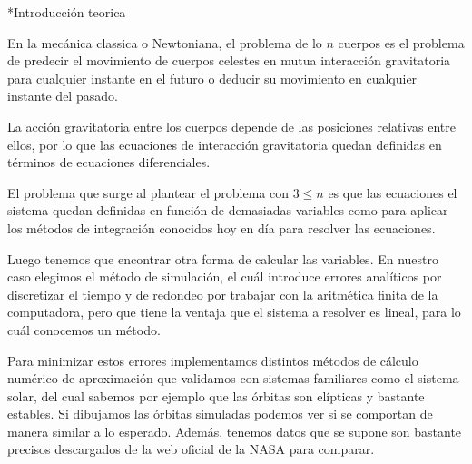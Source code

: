 \documentclass[12pt,titlepage]{article}
\newenvironment{usection}[1]{\newpage\begin{section}*{#1}	\addcontentsline{toc}{section}{#1}}{\end{section}}
\begin{document}


\palabraClave{}

\begin{titlepage}
\maketitle
\end{titlepage}
\tableofcontents
\newpage

	\begin{usection}{Introducción teorica}

		En la mecánica classica o Newtoniana, el problema de lo $n$
		cuerpos es el problema de predecir el movimiento de cuerpos
		celestes en mutua interacción gravitatoria para cualquier
		instante en el futuro o deducir su movimiento en cualquier
		instante del pasado.

		La acción gravitatoria entre los cuerpos depende de las
		posiciones relativas entre ellos, por lo que las ecuaciones de
		interacción gravitatoria quedan definidas en términos de
		ecuaciones diferenciales.

		El problema que surge al plantear el problema con $3 \leq n$ es
		que las ecuaciones el sistema quedan definidas en función de
		demasiadas variables como para aplicar los métodos de integración
		conocidos hoy en día para resolver las ecuaciones.

		Luego tenemos que encontrar otra forma de calcular las
		variables. En nuestro caso elegimos el método de simulación,
		el cuál introduce errores analíticos por discretizar el tiempo y
		de redondeo por trabajar con la aritmética finita de la
		computadora, pero que tiene la ventaja que el sistema a resolver
		es lineal, para lo cuál conocemos un método.

		Para minimizar estos errores implementamos distintos métodos de
		cálculo numérico de aproximación que validamos con sistemas
		familiares como el sistema solar, del cual sabemos por ejemplo
		que las órbitas son elípticas y bastante estables. Si dibujamos
		las órbitas simuladas podemos ver si se comportan de manera
		similar a lo esperado. Además, tenemos datos que se supone son
		bastante precisos descargados de la web oficial de la NASA para
		comparar.

	\end{usection}
\end{document}
